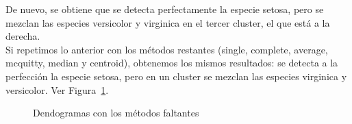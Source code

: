 \documentclass[12pt,a4paper,twoside,openright,titlepage,final]{article}
\begin{document}
De nuevo, se obtiene que se detecta perfectamente la especie setosa, pero se mezclan las especies versicolor y virginica en el tercer cluster, el que está a la derecha.\\

Si repetimos lo anterior con los métodos restantes (single, complete, average, mcquitty, median y centroid), obtenemos los mismos resultados: se detecta a la perfección la especie setosa, pero en un cluster se mezclan las especies virginica y versicolor. Ver Figura~\ref{fig:dendogramas_otros_metodos}.\\

\begin{figure}[htbp]
\centering
{}
\caption{Dendogramas con los métodos faltantes} \label{fig:dendogramas_otros_metodos}
\end{figure}
\end{document}
